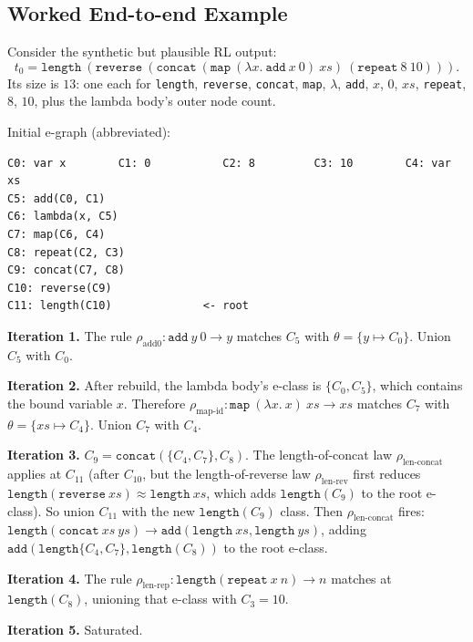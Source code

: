 \documentclass[11pt,a4paper]{article}
\begin{document}
\subsection{Worked End-to-end Example}\label{sec:mlmp-worked}

Consider the synthetic but plausible RL output:
\[
  t_0 = \mathtt{length}\ (\mathtt{reverse}\ (\mathtt{concat}\ (\mathtt{map}\ (\lambda x.\ \mathtt{add}\ x\ 0)\ xs)\ (\mathtt{repeat}\ 8\ 10))).
\]
Its size is $13$: one each for \texttt{length}, \texttt{reverse}, \texttt{concat}, \texttt{map}, $\lambda$, \texttt{add}, $x$, $0$, $xs$, \texttt{repeat}, $8$, $10$, plus the lambda body's outer node count.

Initial e-graph (abbreviated):

\begin{lstlisting}
C0: var x        C1: 0           C2: 8         C3: 10        C4: var xs
C5: add(C0, C1)
C6: lambda(x, C5)
C7: map(C6, C4)
C8: repeat(C2, C3)
C9: concat(C7, C8)
C10: reverse(C9)
C11: length(C10)              <- root
\end{lstlisting}

\textbf{Iteration 1.} The rule $\rho_{\text{add0}}: \mathtt{add}\ y\ 0 \to y$ matches $C_5$ with $\theta = \{y \mapsto C_0\}$. Union $C_5$ with $C_0$.

\textbf{Iteration 2.} After rebuild, the lambda body's e-class is $\{C_0, C_5\}$, which contains the bound variable $x$. Therefore $\rho_{\text{map-id}}: \mathtt{map}\ (\lambda x.\ x)\ xs \to xs$ matches $C_7$ with $\theta = \{xs \mapsto C_4\}$. Union $C_7$ with $C_4$.

\textbf{Iteration 3.} $C_9 = \mathtt{concat}(\{C_4, C_7\}, C_8)$. The length-of-concat law $\rho_{\text{len-concat}}$ applies at $C_{11}$ (after $C_{10}$, but the length-of-reverse law $\rho_{\text{len-rev}}$ first reduces $\mathtt{length}(\mathtt{reverse}\ xs) \approx \mathtt{length}\ xs$, which adds $\mathtt{length}(C_9)$ to the root e-class). So union $C_{11}$ with the new $\mathtt{length}(C_9)$ class. Then $\rho_{\text{len-concat}}$ fires: $\mathtt{length}(\mathtt{concat}\ xs\ ys) \to \mathtt{add}(\mathtt{length}\ xs, \mathtt{length}\ ys)$, adding $\mathtt{add}(\mathtt{length}\{C_4,C_7\}, \mathtt{length}(C_8))$ to the root e-class.

\textbf{Iteration 4.} The rule $\rho_{\text{len-rep}}: \mathtt{length}(\mathtt{repeat}\ x\ n) \to n$ matches at $\mathtt{length}(C_8)$, unioning that e-class with $C_3 = 10$.

\textbf{Iteration 5.} Saturated.
\end{document}
